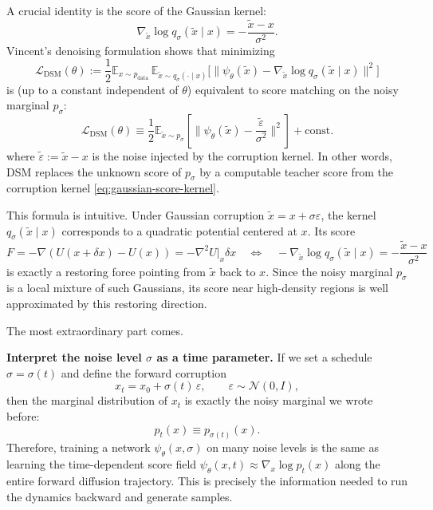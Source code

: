 \documentclass[../main]{subfiles}
\begin{document}
A crucial identity is the score of the Gaussian kernel:
\begin{equation}\label{eq:gaussian-score-kernel}
    \nabla_{\tilde x} \log q_\sigma(\tilde x\mid x)
    = -\frac{\tilde x - x}{\sigma^2}.
\end{equation}
Vincent's denoising formulation shows that minimizing
\begin{equation}\label{eq:dsm}
    \mathcal L_{\mathrm{DSM}}(\theta)
    := \frac12 \mathbb E_{x\sim p_{\mathrm{data}}}\,
       \mathbb E_{\tilde x\sim q_\sigma(\cdot\mid x)}
       \Big[ \big\| \psi_\theta(\tilde x) - \nabla_{\tilde x}\log q_\sigma(\tilde x\mid x)\big\|^2 \Big]
\end{equation}
is (up to a constant independent of $\theta$) equivalent to score matching on the noisy marginal $p_\sigma$:
\begin{equation}
    \mathcal L_{\mathrm{DSM}}(\theta)
    \equiv \frac12 \mathbb E_{\tilde x\sim p_\sigma}\left[\| \psi_\theta(\tilde x) - \frac{\tilde \varepsilon}{\sigma^2}\|^2\right] + \mathrm{const}.
\end{equation}
where $\tilde \varepsilon:=\tilde x-x$ is the noise injected by the corruption kernel. In other words, DSM replaces the unknown score of $p_\sigma$ by a computable
teacher score from the corruption kernel \eqref{eq:gaussian-score-kernel}.
\begin{remark}
    This formula is intuitive.
    Under Gaussian corruption $\tilde x = x + \sigma\varepsilon$, the kernel
    $q_\sigma(\tilde x\mid x)$ corresponds to a quadratic potential centered at $x$.
    Its score
    \begin{equation}
        F=-\nabla (U(x+\delta x)-U(x))=-\nabla^2U|_{x}\delta x\quad\Leftrightarrow\quad-\nabla_{\tilde x}\log q_\sigma(\tilde x\mid x)
        = -\frac{\tilde x-x}{\sigma^2}
    \end{equation}
    is exactly a restoring force pointing from $\tilde x$ back to $x$.
    Since the noisy marginal $p_\sigma$ is a local mixture of such Gaussians,
    its score near high-density regions is well approximated by this restoring direction.
    \end{remark}

    The most extraordinary part comes.

    \textbf{Interpret the noise level $\sigma$ as a time parameter.}
    If we set a schedule $\sigma=\sigma(t)$ and define the forward corruption
    \begin{equation}
        x_t = x_0 + \sigma(t)\,\varepsilon,\qquad \varepsilon\sim\mathcal N(0,I),
    \end{equation}
    then the marginal distribution of $x_t$ is exactly the noisy marginal we wrote before:
    \begin{equation}
        p_t(x) \equiv p_{\sigma(t)}(x).
    \end{equation}
    Therefore, training a network $\psi_\theta(x,\sigma)$ on many noise levels is the same as learning
    the time-dependent score field $\psi_\theta(x,t)\approx \nabla_x \log p_t(x)$ along the entire
    forward diffusion trajectory. This is precisely the information needed to run the dynamics
    backward and generate samples.
\end{document}

